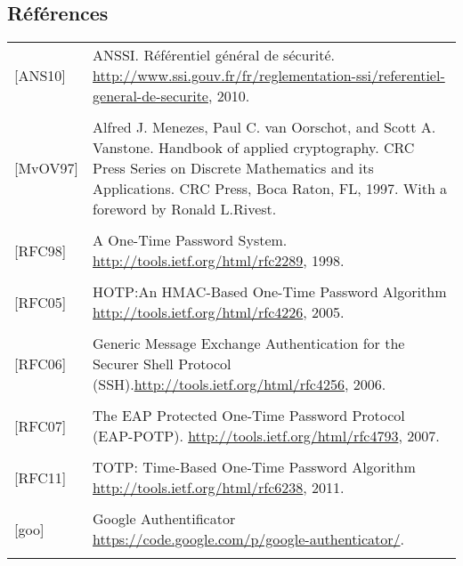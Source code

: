 \documentclass{../../res/univ-projet}
\begin{document}
	\subsection{Références} 
	\begin{tabular}{p{}>{\raggedright\arraybackslash}p{13cm}}
{[ANS10]} & {ANSSI. Référentiel général de sécurité. \href{http://www.ssi.gouv.fr/fr/reglementation-ssi/referentiel-general-de-securite}{http://www.ssi.gouv.fr/fr/reglementation-ssi/referentiel-general-de-securite}, 2010.}
\tabularnewline
\\
{[MvOV97]} & {Alfred J. Menezes, Paul C. van Oorschot, and Scott A. Vanstone. Handbook of applied cryptography. CRC Press Series on Discrete Mathematics and its Applications. CRC Press, Boca Raton, FL, 1997. With a foreword by Ronald L.Rivest.}
\tabularnewline
\\
{[RFC98]} & {A One-Time Password System. \href{http://tools.ietf.org/html/rfc2289}{http://tools.ietf.org/html/rfc2289}, 1998.}
\tabularnewline
\\
{[RFC05]} & {HOTP:An HMAC-Based One-Time Password Algorithm \href{http://tools.ietf.org/html/rfc4226}{http://tools.ietf.org/html/rfc4226}, 2005.}
\tabularnewline
\\
{[RFC06]} & {Generic Message Exchange Authentication for the Securer Shell Protocol (SSH).\href{http://tools.ietf.org/html/rfc4256}{http://tools.ietf.org/html/rfc4256}, 2006.}
\tabularnewline
\\
{[RFC07]} & {The EAP Protected One-Time Password Protocol (EAP-POTP). \href{http://tools.ietf.org/html/rfc4793}{http://tools.ietf.org/html/rfc4793}, 2007.}
\tabularnewline
\\
{[RFC11]} & {TOTP: Time-Based One-Time Password Algorithm \href{http://tools.ietf.org/html/rfc6238}{http://tools.ietf.org/html/rfc6238}, 2011.}
\tabularnewline
\\
{[goo]} & {Google Authentificator \href{https://code.google.com/p/google-authenticator/}{https://code.google.com/p/google-authenticator/}.}
\tabularnewline
\\
\end{tabular}
\newpage

\end{document}

